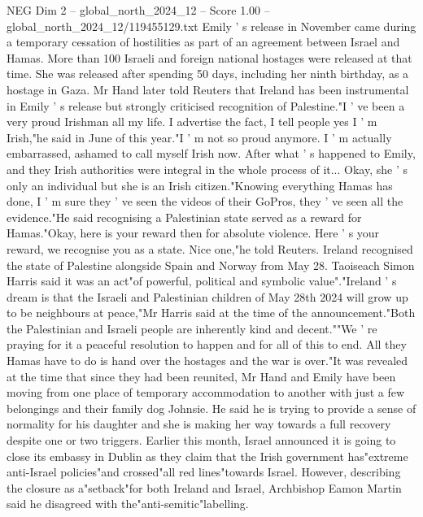 \begin{textsample}{NEG Dim 2 – global\_north\_2024\_12 – Score 1.00 – global\_north\_2024\_12/119455129.txt}  \label{ex:f2_neg_262}
Emily ' s release in November came during a temporary cessation of hostilities as part of an agreement between Israel and Hamas.
More than 100 Israeli and foreign national hostages were released at that time.
She was released after spending 50 days, including her ninth birthday, as a hostage in Gaza.
Mr Hand later told Reuters that Ireland has been instrumental in Emily ' s release but strongly criticised recognition of Palestine."I ' ve been a very proud Irishman all my life.
I advertise the fact, I tell people yes I ' m Irish,"he said in June of this year."I ' m not so proud anymore.
I ' m actually embarrassed, ashamed to call myself Irish now.
After what ' s happened to Emily, and they Irish authorities were integral in the whole process of it...
Okay, she ' s only an individual but she is an Irish citizen."Knowing everything Hamas has done, I ' m sure they ' ve seen the videos of their GoPros, they ' ve seen all the evidence."He said recognising a Palestinian state served as a reward for Hamas."Okay, here is your reward then for absolute violence.
Here ' s your reward, we recognise you as a state.
Nice one,"he told Reuters.
Ireland recognised the state of Palestine alongside Spain and Norway from May 28.
Taoiseach Simon Harris said it was an act"of powerful, political and symbolic value"."Ireland ' s dream is that the Israeli and Palestinian children of May 28th 2024 will grow up to be neighbours at peace,"Mr Harris said at the time of the announcement."Both the Palestinian and Israeli people are inherently kind and decent.""We ' re praying for it a peaceful resolution to happen and for all of this to end.
All they Hamas have to do is hand over the hostages and the war is over."It was revealed at the time that since they had been reunited, Mr Hand and Emily have been moving from one place of temporary accommodation to another with just a few belongings and their family dog Johnsie.
He said he is trying to provide a sense of normality for his daughter and she is making her way towards a full recovery despite one or two triggers.
Earlier this month, Israel announced it is going to close its embassy in Dublin as they claim that the Irish government has"extreme anti-Israel policies"and crossed"all red lines"towards Israel.
However, describing the closure as a"setback"for both Ireland and Israel, Archbishop Eamon Martin said he disagreed with the"anti-semitic"labelling.

\end{textsample}
